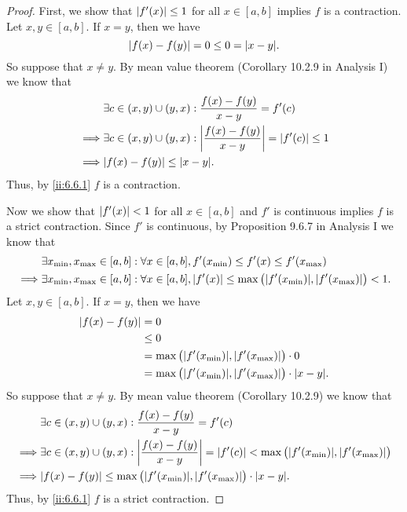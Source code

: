 \begin{proof}
  First, we show that \(\left\lvert f'(x)\right\rvert \leq 1\) for all \(x \in [a, b]\) implies \(f\) is a contraction.
  Let \(x, y \in [a, b]\).
  If \(x = y\), then we have
  \[
    \abs{f(x) - f(y)} = 0 \leq 0 = \abs{x - y}.
  \]
  So suppose that \(x \neq y\).
  By mean value theorem (Corollary 10.2.9 in Analysis I) we know that
  \begin{align*}
             & \exists c \in (x, y) \cup (y, x) : \dfrac{f(x) - f(y)}{x - y} = f'(c)                    \\
    \implies & \exists c \in (x, y) \cup (y, x) : \abs{\dfrac{f(x) - f(y)}{x - y}} = \abs{f'(c)} \leq 1 \\
    \implies & \abs{f(x) - f(y)} \leq \abs{x - y}.
  \end{align*}
  Thus, by \cref{ii:6.6.1} \(f\) is a contraction.

  Now we show that \(\left\lvert f'(x)\right\rvert < 1\) for all \(x \in [a, b]\) and \(f'\) is continuous implies \(f\) is a strict contraction.
  Since \(f'\) is continuous, by Proposition 9.6.7 in Analysis I we know that
  \begin{align*}
             & \exists x_{\min}, x_{\max} \in [a, b] : \forall x \in [a, b], f'(x_{\min}) \leq f'(x) \leq f'(x_{\max})                                  \\
    \implies & \exists x_{\min}, x_{\max} \in [a, b] : \forall x \in [a, b], \abs{f'(x)} \leq \max\big(\abs{f'(x_{\min})}, \abs{f'(x_{\max})}\big) < 1.
  \end{align*}
  Let \(x, y \in [a, b]\).
  If \(x = y\), then we have
  \begin{align*}
    \abs{f(x) - f(y)} & = 0                                                                       \\
                      & \leq 0                                                                    \\
                      & = \max\big(\abs{f'(x_{\min})}, \abs{f'(x_{\max})}\big) \cdot 0            \\
                      & = \max\big(\abs{f'(x_{\min})}, \abs{f'(x_{\max})}\big) \cdot \abs{x - y}.
  \end{align*}
  So suppose that \(x \neq y\).
  By mean value theorem (Corollary 10.2.9) we know that
  \begin{align*}
             & \exists c \in (x, y) \cup (y, x) : \dfrac{f(x) - f(y)}{x - y} = f'(c)                                                                    \\
    \implies & \exists c \in (x, y) \cup (y, x) : \abs{\dfrac{f(x) - f(y)}{x - y}} = \abs{f'(c)} < \max\big(\abs{f'(x_{\min})}, \abs{f'(x_{\max})}\big) \\
    \implies & \abs{f(x) - f(y)} \leq \max\big(\abs{f'(x_{\min})}, \abs{f'(x_{\max})}\big) \cdot \abs{x - y}.
  \end{align*}
  Thus, by \cref{ii:6.6.1} \(f\) is a strict contraction.
\end{proof}

